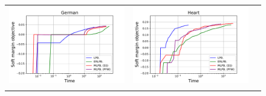 \begin{figure}[p]
\begin{tabular}{ccc}
\begin{minipage}[t]{0.31\hsize}
            \includegraphics[keepaspectratio, scale=0.30]
            {figure/curve_logtime_german.pdf}
        \end{minipage}
        &
        \begin{minipage}[t]{0.31\hsize}
            \centering
            \includegraphics[keepaspectratio, scale=0.30]
            {figure/curve_logtime_heart.pdf}
        \end{minipage}
        \\
        \begin{minipage}[t]{0.31\hsize}
            \centering
            \includegraphics[keepaspectratio, scale=0.30]

\end{minipage}
\end{tabular}
\end{figure}
